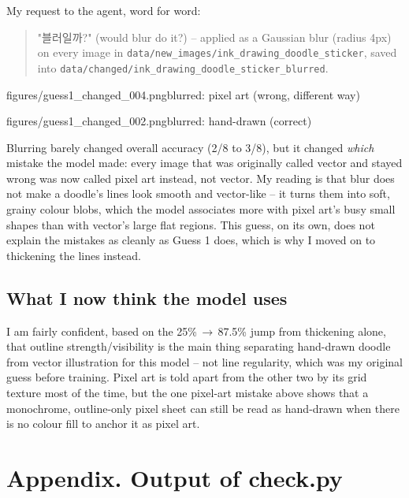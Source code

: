 \documentclass[11pt]{article}
\begin{document}
My request to the agent, word for word:
\begin{quote}
"블러일까?" (would blur do it?) -- applied as a Gaussian blur (radius 4px) on
every image in \texttt{data/new\_images/ink\_drawing\_doodle\_sticker}, saved
into \texttt{data/changed/ink\_drawing\_doodle\_sticker\_blurred}.
\end{quote}

           {figures/guess1_changed_004.png}{blurred: pixel art (wrong, different way)}

           {figures/guess1_changed_002.png}{blurred: hand-drawn (correct)}

Blurring barely changed overall accuracy (2/8 to 3/8), but it changed
\emph{which} mistake the model made: every image that was originally called
vector and stayed wrong was now called pixel art instead, not vector. My
reading is that blur does not make a doodle's lines look smooth and
vector-like -- it turns them into soft, grainy colour blobs, which the model
associates more with pixel art's busy small shapes than with vector's large
flat regions. This guess, on its own, does not explain the mistakes as
cleanly as Guess 1 does, which is why I moved on to thickening the lines
instead.

\subsection*{What I now think the model uses}
I am fairly confident, based on the 25\%\,$\to$\,87.5\% jump from thickening
alone, that outline strength/visibility is the main thing separating
hand-drawn doodle from vector illustration for this model -- not line
regularity, which was my original guess before training. Pixel art is told
apart from the other two by its grid texture most of the time, but the one
pixel-art mistake above shows that a monochrome, outline-only pixel sheet can
still be read as hand-drawn when there is no colour fill to anchor it as
pixel art.

\section*{Appendix. Output of check.py}
\end{document}
